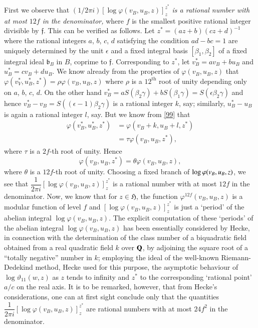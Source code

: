 First we observe that $(1/2\pi
i)[\log\varphi(v_{B},u_{B},z)]^{z^{\ast}}_{z}$ {\em is a rational
  number with at most $12f$ in the denominator,} where $f$ is the
smallest positive rational integer divisible by $\mathfrak{f}$. This
can be verified as follows. Let $z^{\ast}=(az+b)(cz+d)^{-1}$ where the
rational integers $a$, $b$, $c$, $d$ satisfying the condition
$ad-bc=1$ are uniquely determined by the unit $\epsilon$ and a fixed
integral basis $[\beta_{1},\beta_{2}]$ of a fixed integral ideal
$\mathfrak{b}_{B}$ in $B$, coprime to $\mathfrak{f}$. Corresponding to
$z^{\ast}$, let $v^{\ast}_{B}=av_{B}+bu_{B}$ and
$u^{\ast}_{B}=cv_{B}+du_{B}$. We know already from the properties of
$\varphi(v_{B},u_{B},z)$ that
$\varphi(v^{\ast}_{V},u^{\ast}_{B},z^{\ast})=\rho\varphi(v_{B},u_{B},z)$
where $\rho$ is a $12^{\text{th}}$ root of unity depending only on
$a$, $b$, $c$, $d$. On the other hand
$v^{\ast}_{B}=aS(\beta_{2}\gamma)+bS(\beta_{1}\gamma)=S(\epsilon\beta_{2}\gamma)$
and hence $v^{\ast}_{B}-v_{B}=S((\epsilon-1)\beta_{2}\gamma)$ is a
rational integer $k$, say; similarly, $u^{\ast}_{B}-u_{B}$ is again a
rational integer $l$, say. But we know from \eqref{99} that 
\begin{align*}
\varphi(v^{\ast}_{B},u^{\ast}_{B},z^{\ast}) &=
\varphi(v_{B}+k,u_{B}+l,z^{\ast})\\
&= \tau\varphi(v_{B},u_{B},z^{\ast}),
\end{align*}\pageoriginale
where $\tau$ is a $2f$-th root of unity. Hence
$$
\varphi(v_{B},u_{B},z^{\ast})=\theta\varphi(v_{B},u_{B},z),
$$
where $\theta$ is a $12f$-th root of unity. Choosing a fixed branch of
$\log\varphi(v_{B},\break u_{B},z)$, we see that $\dfrac{1}{2\pi i}[\log
  \varphi(v_{B},u_{B},z)]^{z^{\ast}}_{z}$ is a rational number with at
most $12f$ in the denominator. Now, we know that for
$z\in\mathfrak{H}$, the function $\varphi^{12f}(v_{B},u_{B},z)$ is a
modular function of level $f$ and $[\log\varphi(v_{B},u_{B},
  z)]^{z^{\ast}}_{z}$ is just a `period' of the abelian integral
$\log\varphi(v_{B},u_{B},z)$. The explicit computation of these
`periods' of the abelian integral $\log\varphi(v_{B},u_{B},z)$ has
been essentially considered by Hecke, in connection with the
determination of the class number of a biquadratic field obtained from
a real quadratic field $k$ over $\mathbf{Q}$, by adjoining the square root of
a ``totally negative'' number in $k$; employing the ideal of the
well-known Riemann-Dedekind method, Hecke used for this purpose, the
asymptotic behaviour of $\log\vartheta_{11}(w,z)$ as $z$ tends to
infinity and $z^{\ast}$ to the corresponding `rational point' $a/c$ on
the real axis. It is to be remarked, however, that from Hecke's
considerations, one can at first sight conclude only that the
quantities $\dfrac{1}{2\pi
  i}[\log\varphi(v_{B},u_{B},z)]^{z^{\ast}}_{z}$ are rational numbers
with at most $24f^{2}$ in the denominator.

